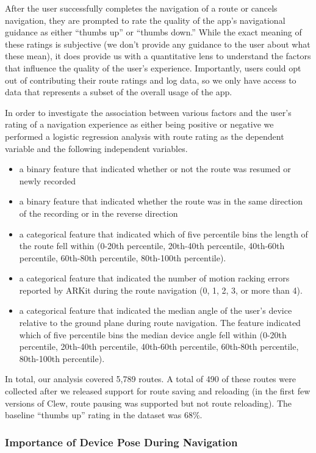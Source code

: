 \documentclass[chi_draft]{sigchi}
\begin{document}
After the user successfully completes the navigation of a route or cancels navigation, they are prompted to rate the quality of the app's navigational guidance as either ``thumbs up'' or ``thumbs down.''   While the exact meaning of these ratings is subjective (we don't provide any guidance to the user about what these mean), it does provide us with a quantitative lens to understand the factors that influence the quality of the user's experience.  Importantly, users could opt out of contributing their route ratings and log data, so we only have access to data that represents a subset of the overall usage of the app.

In order to investigate the association between various factors and the user's rating of a navigation experience as either being positive or negative we performed a logistic regression analysis with route rating as the dependent variable and the following independent variables.
\begin{itemize}
\item a binary feature that indicated whether or not the route was resumed or newly recorded
\item a binary feature that indicated whether the route was in the same direction of the recording or in the reverse direction
\item a categorical feature that indicated which of five percentile bins the length of the route fell within (0-20th percentile, 20th-40th percentile, 40th-60th percentile, 60th-80th percentile, 80th-100th percentile).
\item a categorical feature that indicated the number of motion racking errors reported by ARKit during the route navigation (0, 1, 2, 3, or more than 4).
\item a categorical feature that indicated the median angle of the user's device relative to the ground plane during route navigation.  The feature indicated which of five percentile bins the median device angle fell within (0-20th percentile, 20th-40th percentile, 40th-60th percentile, 60th-80th percentile, 80th-100th percentile).
\end{itemize}

In total, our analysis covered 5,789 routes.  A total of 490 of these routes were collected after we released support for route saving and reloading (in the first few versions of Clew, route pausing was supported but not route reloading).  The baseline ``thumbs up'' rating in the dataset was 68\%. 

\subsubsection{Importance of Device Pose During Navigation}
\end{document}
